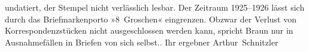 \begin{ledgroupsized}[t]{13cm}
{{{                        undatiert, der Stempel nicht verlässlich lesbar. Der Zeitraum
                            1925–1926 lässt sich durch das
                        Briefmarkenporto »8 Groschen« eingrenzen. Obzwar der Verlust
                        von Korrespondenzstücken nicht ausgeschlossen werden kann, spricht Braun nur in Ausnahmefällen in Briefen
                        von sich selbst.}}}\label{K_L02469_1h}. Ihr ergebner\pend
           \pstart \spacefill\mbox{Arthur Schnitzler}\pend{}\endnumbering{}\end{ledgroupsized}  \newcommand{\dateiname}{L02469}\newcommand{\titel}{Arthur Schnitzler an Felix Braun, [nach dem 15. 3. 1926?]}\newcommand{\editorInnen}{Martin Anton Müller und Gerd-Hermann Susen}
      